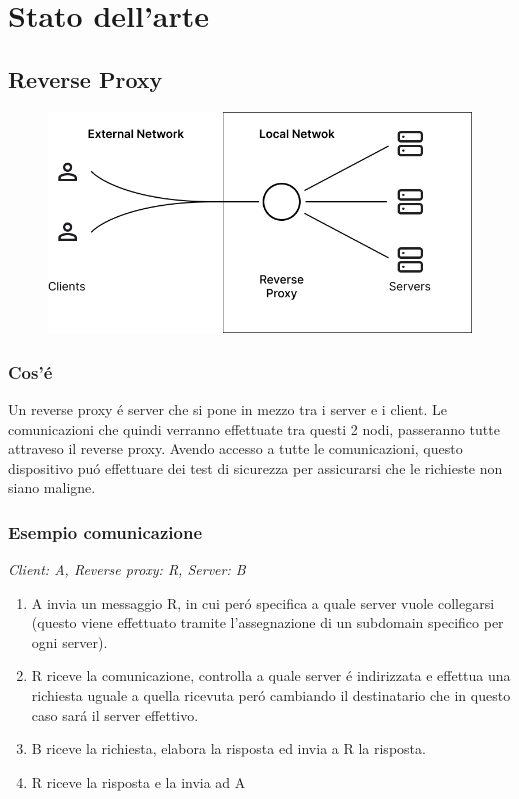 \chapter{Stato dell'arte}
\label{cha:statoArte}

\section{Reverse Proxy}
\begin{figure}[h!]
  \centering
  \includegraphics[width=.6\textwidth]{images/schema.png}
\end{figure}

\subsection{Cos'é}
Un reverse proxy é server che si pone in mezzo tra i server e i client. Le comunicazioni che quindi verranno effettuate tra questi 2 nodi, passeranno tutte attraveso il reverse proxy. Avendo accesso a tutte le comunicazioni, questo dispositivo puó effettuare dei test di sicurezza per assicurarsi che le richieste non siano maligne.

\subsection{Esempio comunicazione}
\textit{Client: A, Reverse proxy: R, Server: B}
\begin{enumerate}
  \item A invia un messaggio R, in cui peró specifica a quale server vuole collegarsi (questo viene effettuato tramite l'assegnazione di un subdomain specifico per ogni server).
  \item R riceve la comunicazione, controlla a quale server é indirizzata e effettua una richiesta uguale a quella ricevuta peró cambiando il destinatario che in questo caso sará il server effettivo.
  \item B riceve la richiesta, elabora la risposta ed invia a R la risposta.
  \item R riceve la risposta e la invia ad A

\end{enumerate}

